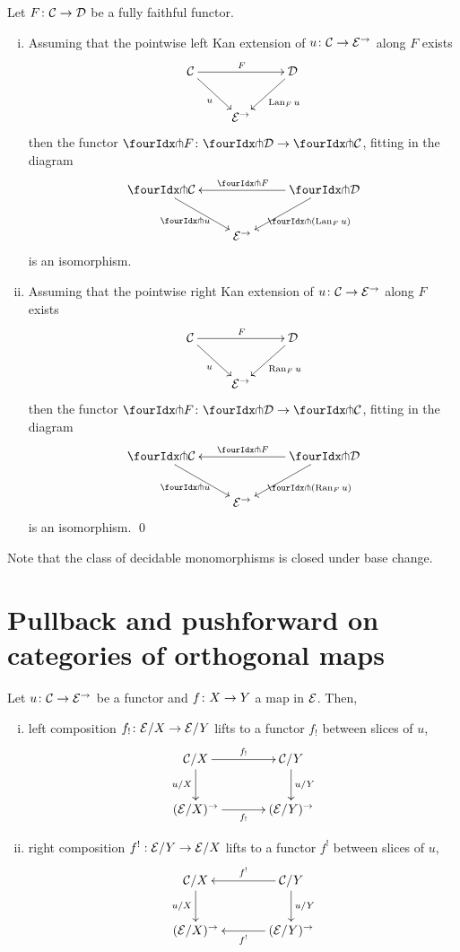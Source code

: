 \documentclass[reqno,10pt,a4paper,oneside]{amsart}
\begin{document}
\begin{proposition} Let $F \colon \mathcal{C} \to \mathcal{D}$ be a fully faithful functor. 
\label{kan-extension-closure}
\begin{enumerate}[(i)]
\item Assuming that the pointwise left Kan extension of 
$u \colon \mathcal{C} \to \mathcal{E}^{\to}$ along $F$ exists
\[
\xymatrix{
  \cal{C}
  \ar[dr]_{u}
  \ar[rr]^{F}
&&
  \cal{D}
  \ar[dl]^{\Lan_F u}
\\&
  \catE^{\to}
}
\]
then the functor $\liftr{F} \co \liftr{\cal{D}} \to \liftr{\cal{C}}$,  fitting in the diagram
\[
\xymatrix{
  \liftr{\cal{C}}
  \ar[dr]_{\liftr{u}}
&&
  \liftr{\cal{D}}
  \ar[ll]_{\liftr{F}}
  \ar[dl]^{\liftr{(\Lan_F u)}}
\\&
  \catE^{\to}
}
\]
is an isomorphism.
\item Assuming that the pointwise right Kan extension of 
$u \colon \mathcal{C} \to \mathcal{E}^{\to}$ along $F$ exists
\[
\xymatrix{
  \cal{C}
  \ar[dr]_{u}
  \ar[rr]^{F}
&&
  \cal{D}
  \ar[dl]^{\Ran_F u}
\\&
  \catE^{\to}
}
\]
then the functor $\liftl{F} \co \liftl{\cal{D}} \to \liftl{\cal{C}}$, fitting in the diagram
\[
\xymatrix{
  \liftl{\cal{C}}
  \ar[dr]_{\liftl{u}}
&&
  \liftl{\cal{D}}
  \ar[ll]_{\liftl{F}}
  \ar[dl]^{\liftl{(\Ran_F u)}}
\\&
  \catE^{\to}
}
\]
is an isomorphism. \qed
\end{enumerate}
\end{proposition}


Note that the class of decidable monomorphisms is closed under base change.



\section{Pullback and pushforward on categories of orthogonal maps}

\begin{lemma}
\label{slicing-2-functorial}
Let $u \colon \mathcal{C} \to \mathcal{E}^{\to}$ be a functor and $f \colon X \to Y$ a map in $\mathcal{E}$. Then, 
\begin{enumerate}[(i)]
\item left composition $f_! \colon \mathcal{E}/X \to \mathcal{E}/Y$ lifts to a functor $f_!$ between slices of $u$,
\[
\xymatrix@C+1em{
  \cal{C}/X
  \ar[r]^-{f_!}
  \ar[d]_{u/X}
&
  \cal{C}/Y
  \ar[d]^{u/Y}
\\
  (\calE/X)^{\to}
  \ar[r]_-{f_!}
&
  (\calE/Y)^{\to}
}
\]
\item right composition $f^! : \mathcal{E}/Y \to \mathcal{E}/X$ lifts to a functor $f^!$ between slices of $u$,
\[
\xymatrix@C+1em{
  \cal{C}/X
  \ar[d]_{u/X}
&
  \cal{C}/Y
  \ar[l]_-{f^!}
  \ar[d]^{u/Y}
\\
  (\calE/X)^{\to}
&
  (\calE/Y)^{\to}
  \ar[l]^-{f^!}
}
\]
\end{enumerate}
\end{lemma}
\end{document}
